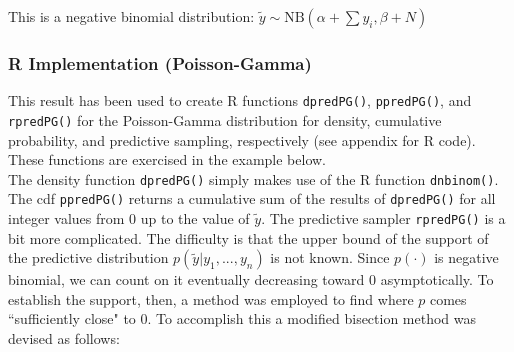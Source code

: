 \documentclass[12pt, a4paper]{article}
\begin{document}
\noindent This is a negative binomial distribution:  $\tilde{y}\sim\text{NB}\left(\alpha+\sum y_i,\beta+N\right)$





    \subsubsection{R Implementation (Poisson-Gamma)}\label{sec:PGimp}

This result has been used to create R functions \texttt{dpredPG()}, \texttt{ppredPG()}, and \texttt{rpredPG()} for the Poisson-Gamma distribution for density, cumulative probability, and predictive sampling, respectively (see appendix for R code).  These functions are exercised in the example below.\\

\noindent The density function \texttt{dpredPG()} simply makes use of the R function \texttt{dnbinom()}.  The cdf \texttt{ppredPG()} returns a cumulative sum of the results of \texttt{dpredPG()} for all integer values from $0$ up to the value of $\tilde{y}$.  The predictive sampler \texttt{rpredPG()} is a bit more complicated. The difficulty is that the upper bound of the support of the predictive distribution $p(\tilde{y}|y_1,...,y_n)$ is not known.  Since $p(\cdot)$ is negative binomial, we can count on it eventually decreasing toward $0$ asymptotically.  To establish the support, then, a method was employed to find where $p$ comes ``sufficiently close" to $0$.  To accomplish this a modified bisection method was devised as follows:\\

\end{document}
